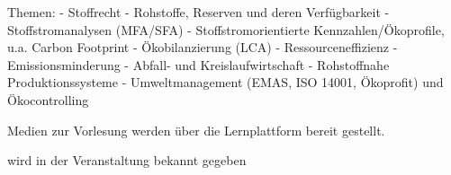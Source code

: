 \begin{course}
\begin{content}
 

Themen:\newline
- Stoffrecht\newline
- Rohstoffe, Reserven und deren Verfügbarkeit\newline
- Stoffstromanalysen (MFA/SFA)\newline
- Stoffstromorientierte Kennzahlen/Ökoprofile, u.a. Carbon Footprint\newline
- Ökobilanzierung (LCA)\newline
- Ressourceneffizienz\newline
- Emissionsminderung\newline
- Abfall- und Kreislaufwirtschaft\newline
- Rohstoffnahe Produktionssysteme\newline
\newline
- Umweltmanagement (EMAS, ISO 14001, Ökoprofit) und Ökocontrolling


\end{content}

\begin{media}Medien zur Vorlesung werden über die Lernplattform bereit gestellt.

\end{media}

\begin{literature}wird in der Veranstaltung bekannt gegeben

\end{literature}



\end{course}